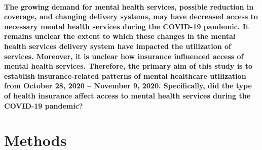 \documentclass[
  12pt,
]{article}
\begin{document}
\hypertarget{the-growing-demand-for-mental-health-services-possible-reduction-in-coverage-and-changing-delivery-systems-may-have-decreased-access-to-necessary-mental-health-services-during-the-covid-19-pandemic.-it-remains-unclear-the-extent-to-which-these-changes-in-the-mental-health-services-delivery-system-have-impacted-the-utilization-of-services.-moreover-it-is-unclear-how-insurance-influenced-access-of-mental-health-services.-therefore-the-primary-aim-of-this-study-is-to-establish-insurance-related-patterns-of-mental-healthcare-utilization-from-october-28-2020-november-9-2020.-specifically-did-the-type-of-health-insurance-affect-access-to-mental-health-services-during-the-covid-19-pandemic}{%
\paragraph{The growing demand for mental health services, possible
reduction in coverage, and changing delivery systems, may have decreased
access to necessary mental health services during the COVID-19 pandemic.
It remains unclear the extent to which these changes in the mental
health services delivery system have impacted the utilization of
services. Moreover, it is unclear how insurance influenced access of
mental health services. Therefore, the primary aim of this study is to
establish insurance-related patterns of mental healthcare utilization
from October 28, 2020 -- November 9, 2020. Specifically, did the type of
health insurance affect access to mental health services during the
COVID-19
pandemic?}\label{the-growing-demand-for-mental-health-services-possible-reduction-in-coverage-and-changing-delivery-systems-may-have-decreased-access-to-necessary-mental-health-services-during-the-covid-19-pandemic.-it-remains-unclear-the-extent-to-which-these-changes-in-the-mental-health-services-delivery-system-have-impacted-the-utilization-of-services.-moreover-it-is-unclear-how-insurance-influenced-access-of-mental-health-services.-therefore-the-primary-aim-of-this-study-is-to-establish-insurance-related-patterns-of-mental-healthcare-utilization-from-october-28-2020-november-9-2020.-specifically-did-the-type-of-health-insurance-affect-access-to-mental-health-services-during-the-covid-19-pandemic}}

\hypertarget{methods}{%
\section{\texorpdfstring{\textbf{Methods}}{Methods}}\label{methods}}
\end{document}

